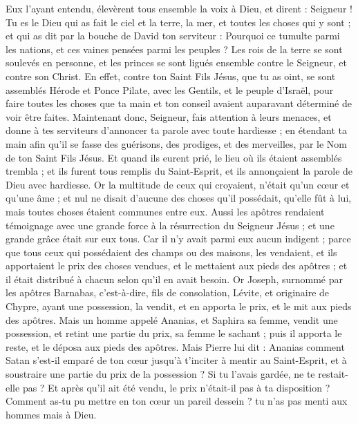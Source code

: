 \begin{multicols}{2}
Eux l'ayant entendu, élevèrent tous ensemble la voix à Dieu, et dirent : Seigneur ! Tu es le Dieu qui as fait le ciel et la terre, la mer, et toutes les choses qui y sont ;
et qui as dit par la bouche de David ton serviteur : Pourquoi ce tumulte parmi les nations, et ces vaines pensées parmi les peuples ?
Les rois de la terre se sont soulevés en personne, et les princes se sont ligués ensemble contre le Seigneur, et contre son Christ.
En effet, contre ton Saint Fils Jésus, que tu as oint, se sont assemblés Hérode et Ponce Pilate, avec les Gentils, et le peuple d'Israël,
pour faire toutes les choses que ta main et ton conseil avaient auparavant déterminé de voir être faites.
Maintenant donc, Seigneur, fais attention à leurs menaces, et donne à tes serviteurs d'annoncer ta parole avec toute hardiesse ;
en étendant ta main afin qu'il se fasse des guérisons, des prodiges, et des merveilles, par le Nom de ton Saint Fils Jésus.
Et quand ils eurent prié, le lieu où ils étaient assemblés trembla ; et ils furent tous remplis du Saint-Esprit, et ils annonçaient la parole de Dieu avec hardiesse.
Or la multitude de ceux qui croyaient, n'était qu'un cœur et qu'une âme ; et nul ne disait d'aucune des choses qu'il possédait, qu'elle fût à lui, mais toutes choses étaient communes entre eux.
Aussi les apôtres rendaient témoignage avec une grande force à la résurrection du Seigneur Jésus ; et une grande grâce était sur eux tous.
Car il n'y avait parmi eux aucun indigent ; parce que tous ceux qui possédaient des champs ou des maisons, les vendaient, et ils apportaient le prix des choses vendues,
et le mettaient aux pieds des apôtres ; et il était distribué à chacun selon qu'il en avait besoin.
Or Joseph, surnommé par les apôtres Barnabas, c'est-à-dire, fils de consolation, Lévite, et originaire de Chypre,
ayant une possession, la vendit, et en apporta le prix, et le mit aux pieds des apôtres.
\VerseOne{}Mais un homme appelé Ananias, et Saphira sa femme, vendit une possession,
et retint une partie du prix, sa femme le sachant ; puis il apporta le reste, et le déposa aux pieds des apôtres.
Mais Pierre lui dit : Ananias comment Satan s'est-il emparé de ton cœur jusqu’à t'inciter à mentir au Saint-Esprit, et à soustraire une partie du prix de la possession ?
Si tu l'avais gardée, ne te restait-elle pas ? Et après qu’il ait été vendu, le prix n’était-il pas à ta disposition ? Comment as-tu pu mettre en ton cœur un pareil dessein ? tu n’as pas menti aux hommes mais à Dieu.

\end{multicols}
